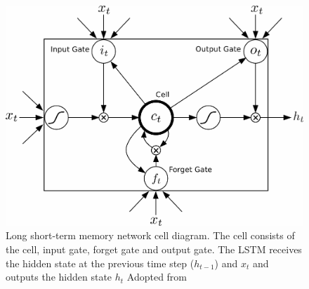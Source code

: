 \begin{figure}
\includegraphics[scale=0.23]{lstm_2.png}
\caption{Long short-term memory network cell diagram. The cell consists of the 
	cell, input gate, forget gate and output gate. The LSTM receives
	the hidden state at the previous time step ($h_{t - 1}$) and $x_t$
	and outputs the hidden state $h_{t}$
	Adopted from 
\citep{graves2013hybrid} }
\label{fig:lstm_arch}
\end{figure}

